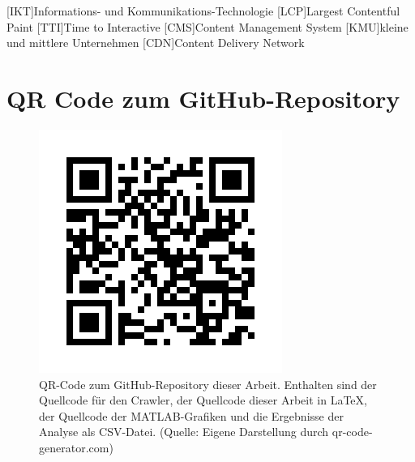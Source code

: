 \documentclass[Bachelor,BIF,german,IEEE]{BASE/twbook}
\begin{document}
\printbib                                                        %
\clearpage

\listoffigures                                                   %
\clearpage

\listoftables                                                    %
\clearpage

\listoflistings                                                  %
\clearpage

{}
\chapter*{\listacroname}
\begin{acronym}[XXXXX]
    [IKT]{Informations- und Kommunikations-Technologie}
    [LCP]{Largest Contentful Paint}
    [TTI]{Time to Interactive}
    [CMS]{Content Management System}
    [KMU]{kleine und mittlere Unternehmen}
    [CDN]{Content Delivery Network}
\end{acronym}
\clearpage
\appendix

\chapter{QR Code zum GitHub-Repository}
\label{chap:appendix}

\begin{figure}[!htbp]
\centering
\includegraphics[width=0.5\linewidth]{PICs/frame}
\caption{QR-Code zum GitHub-Repository dieser Arbeit. Enthalten sind der Quellcode für den Crawler, der Quellcode dieser Arbeit in LaTeX, der Quellcode der MATLAB-Grafiken und die Ergebnisse der Analyse als CSV-Datei. (Quelle: Eigene Darstellung durch qr-code-generator.com)}\label{Abb2}
\end{figure}
\end{document}
